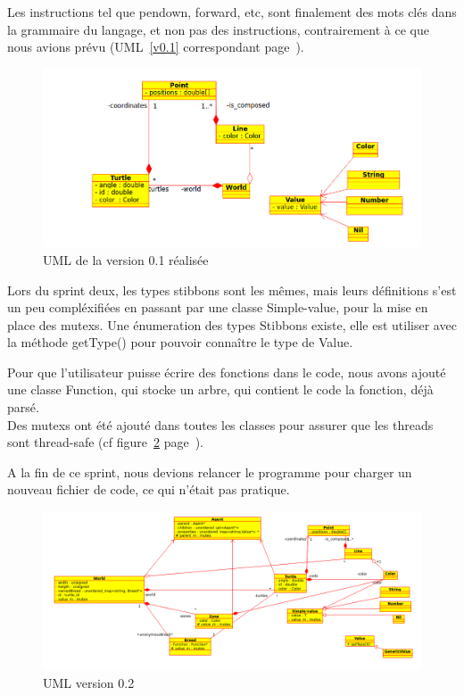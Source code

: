 Les instructions tel que pendown, forward, etc, sont finalement des mots clés dans la grammaire du langage, et non pas des instructions, contrairement à ce que nous avions prévu (UML~\ref{v0.1} correspondant page~\pageref{v0.1}).\\


\begin{figure}[h]
\caption{\label{v0.1R} UML de la version 0.1 réalisée}
\includegraphics[scale=0.5]{doc/report/uml/v01reel.png}
\end{figure}

Lors du sprint deux, les types stibbons sont les mêmes, mais leurs définitions s'est un peu compléxifiées en passant par une classe Simple-value, pour la mise en place des mutexs. Une énumeration des types Stibbons existe, elle est utiliser avec la méthode getType() pour pouvoir connaître le type de Value.


Pour que l'utilisateur puisse écrire des fonctions dans le code, nous avons ajouté une classe Function, qui stocke un arbre, qui contient le code la fonction, déjà parsé.
\\ Des mutexs ont été ajouté dans toutes les classes pour assurer que les threads sont thread-safe (cf figure~\ref{v0.2} page~\pageref{v0.2}).


A la fin de ce sprint, nous devions relancer le programme pour charger un nouveau fichier de code, ce qui n'était pas pratique.



\begin{figure}[h]
\caption{\label{v0.2} UML version 0.2}
\includegraphics[scale=0.45]{doc/report/uml/v02reel.png}
\end{figure}

